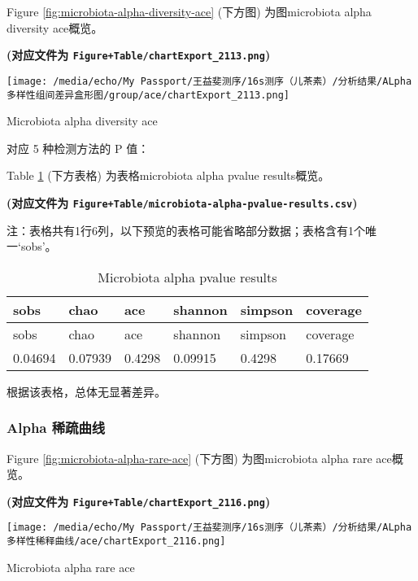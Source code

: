 \documentclass[
]{article}
\begin{document}
Figure \ref{fig:microbiota-alpha-diversity-ace} (下方图) 为图microbiota alpha diversity ace概览。

\textbf{(对应文件为 \texttt{Figure+Table/chartExport\_2113.png})}

\def\@captype{figure}
\begin{center}
\texttt{[image: /media/echo/My Passport/王益斐测序/16s测序（儿茶素）/分析结果/ALpha多样性组间差异盒形图/group/ace/chartExport\_2113.png]}
\caption{Microbiota alpha diversity ace}\label{fig:microbiota-alpha-diversity-ace}
\end{center}

对应 5 种检测方法的 P 值：

Table \ref{tab:microbiota-alpha-pvalue-results} (下方表格) 为表格microbiota alpha pvalue results概览。

\textbf{(对应文件为 \texttt{Figure+Table/microbiota-alpha-pvalue-results.csv})}

\begin{center}\begin{tcolorbox}[colback=gray!10, colframe=gray!50, width=0.9\linewidth, arc=1mm, boxrule=0.5pt]注：表格共有1行6列，以下预览的表格可能省略部分数据；表格含有1个唯一`sobs'。
\end{tcolorbox}
\end{center}

\begin{longtable}[]{@{}llllll@{}}
\caption{\label{tab:microbiota-alpha-pvalue-results}Microbiota alpha pvalue results}\tabularnewline
\toprule
sobs & chao & ace & shannon & simpson & coverage\tabularnewline
\midrule
\endfirsthead
\toprule
sobs & chao & ace & shannon & simpson & coverage\tabularnewline
\midrule
\endhead
0.04694 & 0.07939 & 0.4298 & 0.09915 & 0.4298 & 0.17669\tabularnewline
\bottomrule
\end{longtable}

根据该表格，总体无显著差异。

\hypertarget{alpha-ux7a00ux758fux66f2ux7ebf}{%
\subsubsection{Alpha 稀疏曲线}\label{alpha-ux7a00ux758fux66f2ux7ebf}}

Figure \ref{fig:microbiota-alpha-rare-ace} (下方图) 为图microbiota alpha rare ace概览。

\textbf{(对应文件为 \texttt{Figure+Table/chartExport\_2116.png})}

\def\@captype{figure}
\begin{center}
\texttt{[image: /media/echo/My Passport/王益斐测序/16s测序（儿茶素）/分析结果/ALpha多样性稀释曲线/ace/chartExport\_2116.png]}
\caption{Microbiota alpha rare ace}\label{fig:microbiota-alpha-rare-ace}
\end{center}
\end{document}
